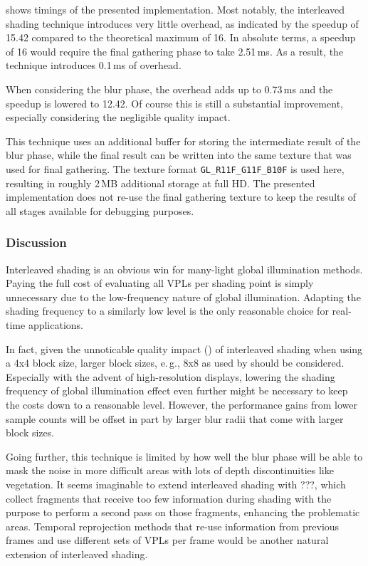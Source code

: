  shows timings of the presented implementation. Most notably, the interleaved shading technique introduces very little overhead, as indicated by the speedup of 15.42 compared to the theoretical maximum of 16. In absolute terms, a speedup of 16 would require the final gathering phase to take 2.51\,ms. As a result, the technique introduces 0.1\,ms of overhead.

When considering the blur phase, the overhead adds up to 0.73\,ms and the speedup is lowered to 12.42. Of course this is still a substantial improvement, especially considering the negligible quality impact.

This technique uses an additional buffer for storing the intermediate result of the blur phase, while the final result can be written into the same texture that was used for final gathering. The texture format \texttt{GL\_R11F\_G11F\_B10F} is used here, resulting in roughly 2\,MB additional storage at full HD. The presented implementation does not re-use the final gathering texture to keep the results of all stages available for debugging purposes.


\subsubsection{Discussion}
Interleaved shading is an obvious win for many-light global illumination methods. Paying the full cost of evaluating all VPLs per shading point is simply unnecessary due to the low-frequency nature of global illumination. Adapting the shading frequency to a similarly low level is the only reasonable choice for real-time applications.

In fact, given the unnoticable quality impact () of interleaved shading when using a 4x4 block size, larger block sizes, e.\,g., 8x8 as used by \citet{hedman2016sequential} should be considered. Especially with the advent of high-resolution displays, lowering the shading frequency of global illumination effect even further might be necessary to keep the costs down to a reasonable level. However, the performance gains from lower sample counts will be offset in part by larger blur radii that come with larger block sizes.

Going further, this technique is limited by how well the blur phase will be able to mask the noise in more difficult areas with lots of depth discontinuities like vegetation. It seems imaginable to extend interleaved shading with ???, which collect fragments that receive too few information during shading with the purpose to perform a second pass on those fragments, enhancing the problematic areas. Temporal reprojection methods that re-use information from previous frames and use different sets of VPLs per frame would be another natural extension of interleaved shading.

